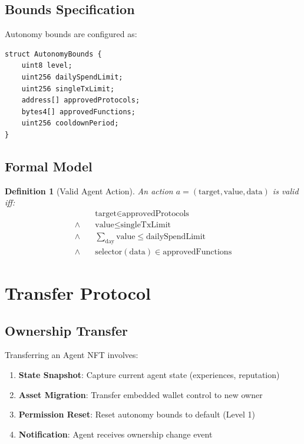 \documentclass[11pt,letterpaper]{article}
\newtheorem{definition}{Definition}[section]
\begin{document}
\subsection{Bounds Specification}

Autonomy bounds are configured as:

\begin{lstlisting}[style=solidity]
struct AutonomyBounds {
    uint8 level;
    uint256 dailySpendLimit;
    uint256 singleTxLimit;
    address[] approvedProtocols;
    bytes4[] approvedFunctions;
    uint256 cooldownPeriod;
}
\end{lstlisting}

\subsection{Formal Model}

\begin{definition}[Valid Agent Action]
An action $a = (\text{target}, \text{value}, \text{data})$ is valid iff:
\begin{equation}
\begin{aligned}
&\text{target} \in \text{approvedProtocols} \\
\land\quad &\text{value} \leq \text{singleTxLimit} \\
\land\quad &\sum_{\text{day}} \text{value} \leq \text{dailySpendLimit} \\
\land\quad &\text{selector}(\text{data}) \in \text{approvedFunctions}
\end{aligned}
\end{equation}
\end{definition}

\section{Transfer Protocol}
\label{sec:transfer}

\subsection{Ownership Transfer}

Transferring an Agent NFT involves:

\begin{enumerate}
    \item \textbf{State Snapshot}: Capture current agent state (experiences, reputation)
    \item \textbf{Asset Migration}: Transfer embedded wallet control to new owner
    \item \textbf{Permission Reset}: Reset autonomy bounds to default (Level 1)
    \item \textbf{Notification}: Agent receives ownership change event
\end{enumerate}
\end{document}
